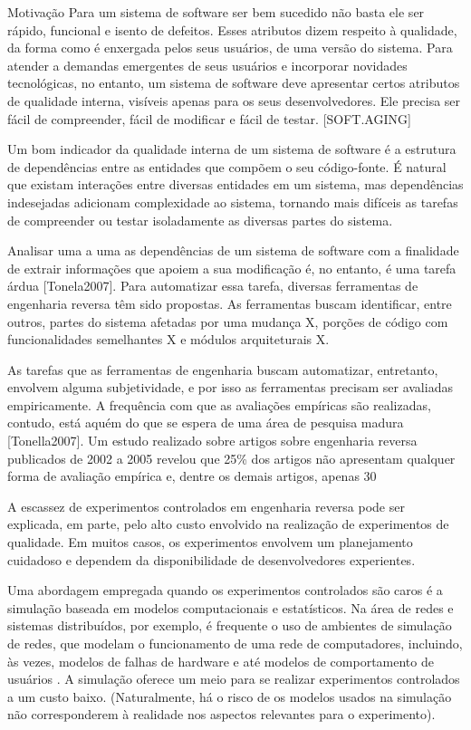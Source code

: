\begin{section}{Motivação}
		Para um sistema de software ser bem sucedido não basta ele ser rápido, funcional e isento de defeitos. Esses atributos dizem respeito à qualidade, da forma como é enxergada pelos seus usuários, de uma versão do sistema. Para atender a demandas emergentes de seus usuários e incorporar novidades tecnológicas, no entanto, um sistema de software deve apresentar certos atributos de qualidade interna, visíveis apenas para os seus desenvolvedores. Ele precisa ser fácil de compreender, fácil de modificar e fácil de testar. [SOFT.AGING]

		Um bom indicador da qualidade interna de um sistema de software é a estrutura de dependências entre as entidades que compõem o seu código-fonte. É natural que existam interações entre diversas entidades em um sistema, mas dependências indesejadas adicionam complexidade ao sistema, tornando mais difíceis as tarefas de compreender ou testar isoladamente as diversas partes do sistema.

		Analisar uma a uma as dependências de um sistema de software com a finalidade de extrair informações que apoiem a sua modificação é, no entanto, é uma tarefa árdua [Tonela2007]. Para automatizar essa tarefa, diversas ferramentas de engenharia reversa têm sido propostas. As ferramentas buscam identificar, entre outros, partes do sistema afetadas por uma mudança X, porções de código com funcionalidades semelhantes X e módulos arquiteturais X.

	As tarefas que as ferramentas de engenharia buscam automatizar, entretanto, envolvem alguma subjetividade, e por isso as ferramentas precisam ser avaliadas empiricamente. A frequência com que as avaliações empíricas são realizadas, contudo, está aquém do que se espera de uma área de pesquisa madura [Tonella2007]. Um estudo realizado sobre artigos sobre engenharia reversa publicados de 2002 a 2005 revelou que 25\% dos artigos não apresentam qualquer forma de avaliação empírica e, dentre os demais artigos, apenas 30%

		A escassez de experimentos controlados em engenharia reversa pode ser explicada, em parte, pelo alto custo envolvido na realização de experimentos de qualidade. Em muitos casos, os experimentos envolvem um planejamento cuidadoso e dependem da disponibilidade de desenvolvedores experientes.

		Uma abordagem empregada quando os experimentos controlados são caros é a simulação baseada em modelos computacionais e estatísticos. Na área de redes e sistemas distribuídos, por exemplo, é frequente o uso de ambientes de simulação de redes, que modelam o funcionamento de uma rede de computadores, incluindo, às vezes, modelos de falhas de hardware e até modelos de comportamento de usuários \cite{White2002}. A simulação oferece um meio para se realizar experimentos controlados a um custo baixo. (Naturalmente, há o risco de os modelos usados na simulação não corresponderem à realidade nos aspectos relevantes para o experimento).


\end{section}
